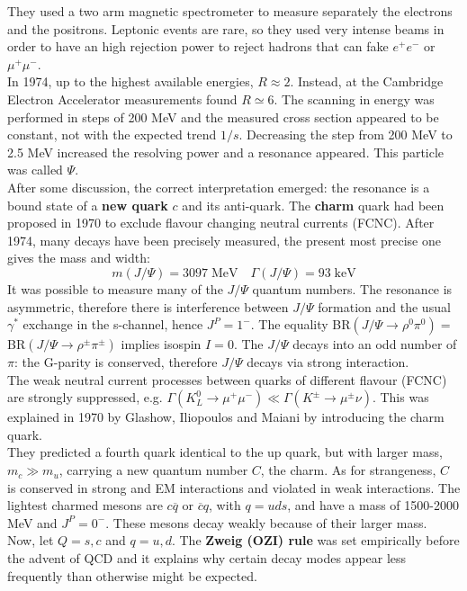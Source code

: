 \documentclass[10.75pt,a4paper,openright,bottom=2cm]{article}
\begin{document}
They used a two arm magnetic spectrometer to measure separately the electrons and the positrons. Leptonic events are rare, so they used very intense beams in order to have an high rejection power to reject hadrons that can fake $e^+e^-$ or $\mu^+\mu^-$.\\ In 1974, up to the highest available energies, $R\approx2$. Instead, at the Cambridge Electron Accelerator measurements found $R\simeq6$. The scanning in energy was performed in steps of 200 MeV and the measured cross section appeared to be constant, not with the expected trend $1/s$. Decreasing the step from 200 MeV to 2.5 MeV increased the resolving power and a resonance appeared. This particle was called $\Psi$.\\
After some discussion, the correct interpretation emerged: the resonance is a bound state of a \textbf{new quark} $c$ and its anti-quark. The \textbf{charm} quark had been proposed in 1970 to exclude flavour changing neutral currents (FCNC). After 1974, many decays have been precisely measured, the present most precise one gives the mass and width:
\[
m(J/\Psi)=3097\;\text{MeV} \quad \Gamma(J/\Psi)=93\;\text{keV}
\]
It was possible to measure many of the $J/\Psi$ quantum numbers. The resonance is asymmetric, therefore there is interference between $J/\Psi$ formation and the usual $\gamma^*$ exchange in the s-channel, hence $J^P=1^-$. The equality BR$(J/\Psi\to\rho^0\pi^0)=$BR$(J/\Psi\to\rho^\pm\pi^\pm)$ implies isospin $I=0$. The $J/\Psi$ decays into an odd number of $\pi$: the G-parity is conserved, therefore $J/\Psi$ decays via strong interaction.\\
The weak neutral current processes between quarks of different flavour (FCNC) are strongly suppressed, e.g. $\Gamma(K_L^0\to\mu^+\mu^-)\ll\Gamma(K^\pm\to\mu^\pm\nu)$. This was explained in 1970 by Glashow, Iliopoulos and Maiani by introducing the charm quark.\\
They predicted a fourth quark identical to the up quark, but with larger mass, $m_c\gg m_u$, carrying a new quantum number $C$, the charm. As for strangeness, $C$ is conserved in strong and EM interactions and violated in weak interactions. The lightest charmed mesons are $c\overline{q}$ or $\overline{c}q$, with $q=uds$, and have a mass of 1500-2000 MeV and $J^P=0^-$. These mesons decay weakly because of their larger mass.\\
Now, let $Q=s,c$ and $q=u,d$. The \textbf{Zweig (OZI) rule} was set empirically before the advent of QCD and it explains why certain decay modes appear less frequently than otherwise might be expected.
\end{document}
